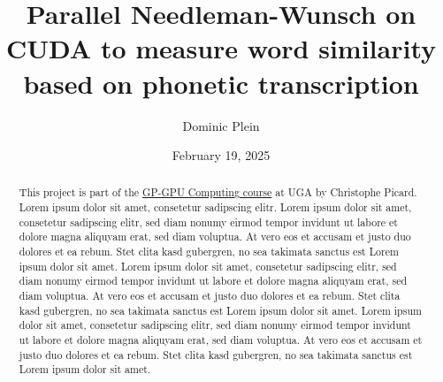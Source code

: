 \documentclass[10pt,a4paper,english]{article}
\title{\vspace{-0.0em}Parallel Needleman-Wunsch on CUDA to measure word similarity based on phonetic transcription}
\author{Dominic Plein}
\date{February 19, 2025}
\newcommand{\abstractText}{\noindent
	\newline\noindent
	This project is part of the \href{https://membres-ljk.imag.fr/Christophe.Picard/teaching/gp-gpu}{GP-GPU Computing course} at UGA by Christophe Picard.
    Lorem ipsum dolor sit amet, consetetur sadipscing elitr.
    Lorem ipsum dolor sit amet, consetetur sadipscing elitr, sed diam nonumy eirmod tempor invidunt ut labore et dolore magna aliquyam erat, sed diam voluptua. At vero eos et accusam et justo duo dolores et ea rebum. Stet clita kasd gubergren, no sea takimata sanctus est Lorem ipsum dolor sit amet. Lorem ipsum dolor sit amet, consetetur sadipscing elitr, sed diam nonumy eirmod tempor invidunt ut labore et dolore magna aliquyam erat, sed diam voluptua. At vero eos et accusam et justo duo dolores et ea rebum. Stet clita kasd gubergren, no sea takimata sanctus est Lorem ipsum dolor sit amet. Lorem ipsum dolor sit amet, consetetur sadipscing elitr, sed diam nonumy eirmod tempor invidunt ut labore et dolore magna aliquyam erat, sed diam voluptua. At vero eos et accusam et justo duo dolores et ea rebum. Stet clita kasd gubergren, no sea takimata sanctus est Lorem ipsum dolor sit amet.
}
\begin{document}
\setlength{\abovedisplayskip}{0.2em}

\maketitle
\begin{abstract}
    \abstractText
    \newline
    \newline
\end{abstract}



\begin{multicols*}{2}
\tableofcontents

\newcolumn





\end{multicols*}

\printglossary[type=\acronymtype]
\end{document}
